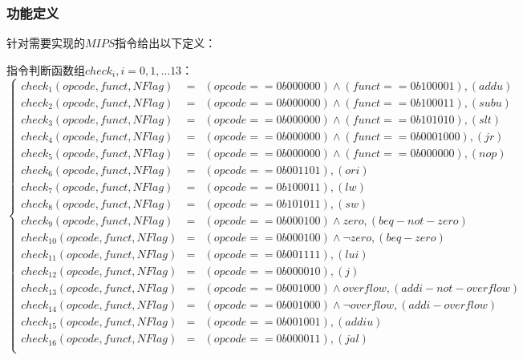 \documentclass[main.tex]{subfiles}
\begin{document}
\clearpage
\subsubsection{功能定义}

针对需要实现的$MIPS$指令给出以下定义：

指令判断函数组$check_i, i=0, 1, \dots 13$：
$$
\left\{
\begin{array}{rcl}
check_1(opcode, funct, NFlag) &=& (opcode == 0b000000) \land (funct == 0b100001), (addu) \\
check_2(opcode, funct, NFlag) &=& (opcode == 0b000000) \land (funct == 0b100011), (subu)\\
check_3(opcode, funct, NFlag) &=& (opcode == 0b000000) \land (funct == 0b101010), (slt)\\
check_4(opcode, funct, NFlag) &=& (opcode == 0b000000) \land (funct == 0b0001000), (jr)\\
check_5(opcode, funct, NFlag) &=& (opcode == 0b000000) \land (funct == 0b000000), (nop)\\
check_6(opcode, funct, NFlag) &=& (opcode == 0b001101), (ori)\\
check_7(opcode, funct, NFlag) &=& (opcode == 0b100011), (lw)\\
check_8(opcode, funct, NFlag) &=& (opcode == 0b101011), (sw)\\
check_9(opcode, funct, NFlag) &=& (opcode == 0b000100) \land zero, (beq-not-zero)\\
check_{10}(opcode, funct, NFlag) &=& (opcode == 0b000100) \land \neg zero, (beq-zero)\\
check_{11}(opcode, funct, NFlag) &=& (opcode == 0b001111), (lui)\\
check_{12}(opcode, funct, NFlag) &=& (opcode == 0b000010), (j)\\
check_{13}(opcode, funct, NFlag) &=& (opcode == 0b001000) \land overflow, (addi-not-overflow)\\
check_{14}(opcode, funct, NFlag) &=& (opcode == 0b001000) \land \neg overflow, (addi-overflow)\\
check_{15}(opcode, funct, NFlag) &=& (opcode == 0b001001), (addiu)\\
check_{16}(opcode, funct, NFlag) &=& (opcode == 0b000011), (jal)\\
\end{array}
\right.
$$
\end{document}
